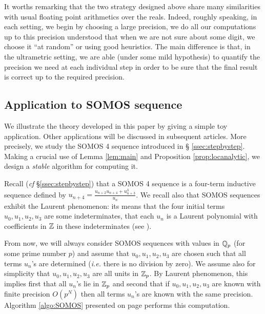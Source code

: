 \documentclass{lms}
\begin{document}
It worths remarking that the two strategy designed above share many 
similarities with usual floating point arithmetics over the reals. 
Indeed, roughly speaking, in each setting, we begin by choosing a large 
precision, we do all our computations up to this precision understood 
that when we are not sure about some digit, we choose it ``at random'' 
or using good heuristics. The main difference is that, in the 
ultrametric setting, we are able (under some mild hypothesis) to 
quantify the precision we need at each individual step in order to be 
sure that the final result is correct up to the required precision.

\subsection{Application to SOMOS sequence}
\label{ssec:SOMOS-solution}

We illustrate the theory developed in this paper by giving a simple 
toy application. Other applications will be discussed in subsequent 
articles. More precisely, we study the SOMOS 4 sequence introduced in \S 
\ref{ssec:stepbystep}. Making a crucial use of Lemma \ref{lem:main} and 
Proposition \ref{prop:locanalytic}, we design a \emph{stable} algorithm 
for computing it.

Recall (\emph{cf} \S \ref{ssec:stepbystep}) that a SOMOS 4 sequence is a 
four-term inductive sequence defined by $u_{n+4} = \frac{u_{n+2} u_{n+4} 
+ u_{n+3}^3}{u_n}$. We recall also that SOMOS sequences exhibit the 
Laurent phenomenon: its means that the four initial terms $u_0, u_1, 
u_2, u_3$ are some indeterminates, that each $u_n$ is a Laurent 
polynomial with coefficients in $\mathbb Z$ in these indeterminates
(see \cite{Fomin-Zelevinsky}).

From now, we will always consider SOMOS sequences with values in $\mathbb Q_p$ 
(for some prime number $p$) and assume that $u_0, u_1, u_2, u_3$ are 
chosen such that all terms $u_n$'s are determined (\emph{i.e.} there is 
no division by zero). We assume also for simplicity that $u_0, u_1, u_2, 
u_3$ are all units in $\mathbb Z_p$. By Laurent phenomenon, this implies first 
that all $u_n$'s lie in $\mathbb Z_p$ and second that if $u_0, u_1, u_2, u_3$ 
are known with finite precision $O(p^N)$ then all terms $u_n$'s are 
known with the same precision. Algorithm \ref{algo:SOMOS} presented on 
page \pageref{algo:SOMOS} performs this computation.
\end{document}
